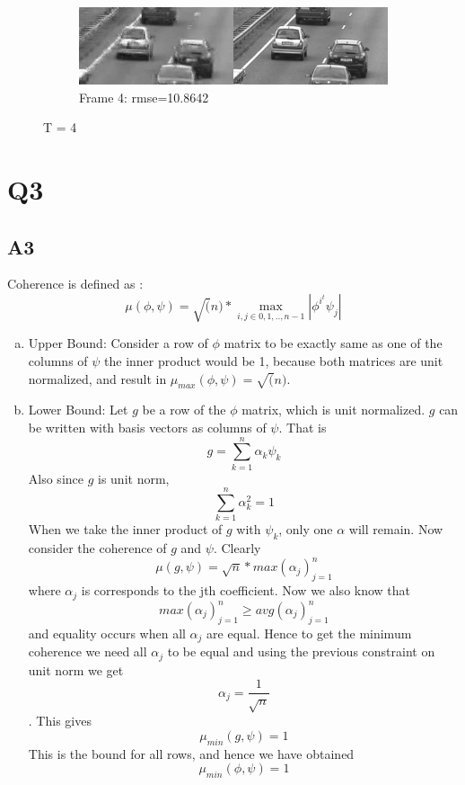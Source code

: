 \documentclass{article}
\begin{document}
\begin{figure}[H]
  \begin{subfigure}[t]{1.0\linewidth}
    \centering
    \includegraphics[scale=0.5]{images/frame_4_t4}
    \caption{Frame 4: rmse=10.8642}
  \end{subfigure}
  \caption{T = 4}
\end{figure}






\section*{Q3}
\subsection*{A3}
Coherence is defined as : $$\mu(\phi,\psi) = \sqrt(n)*\max_{i,j \in {0,1,..,n-1}} |\phi^{i^{t}}\psi_j|$$

\begin{enumerate}[(a)]
\item Upper Bound:
  Consider a row of $\phi$ matrix to be exactly same as one of the columns of $\psi$ the inner product would be 1, because both matrices are unit normalized, and result in $\mu_{max}(\phi,\psi) = \sqrt(n)$.
\item Lower Bound:
  Let $g$ be a row of the $\phi$ matrix, which is unit normalized. $g$ can be written with basis vectors as columns of $\psi$. That is
  $$g = \sum_{k=1}^{n}\alpha_k \psi_k$$
  Also since $g$ is unit norm, $$\sum_{k=1}^n\alpha_k^2 = 1$$
  When we take the inner product of $g$ with $\psi_k$, only one $\alpha$ will remain. Now consider the coherence of $g$ and $\psi$. Clearly
  $$\mu(g,\psi) = \sqrt{n} * max(\alpha_j)_{j=1}^n$$ where $\alpha_j$ is corresponds to the jth coefficient. Now we also know that $$max(\alpha_j)_{j=1}^n \ge avg(\alpha_j)_{j=1}^n$$ and equality occurs when all $\alpha_j$ are equal. Hence to get the minimum coherence we need all $\alpha_j$ to be equal and using the previous constraint on unit norm we get $$\alpha_j = \frac{1}{\sqrt{n}}$$. This gives $$\mu_{min}(g,\psi) = 1$$
  This is the bound for all rows, and hence we have obtained $$\mu_{min}(\phi,\psi) = 1$$
\end{enumerate}
\end{document}
